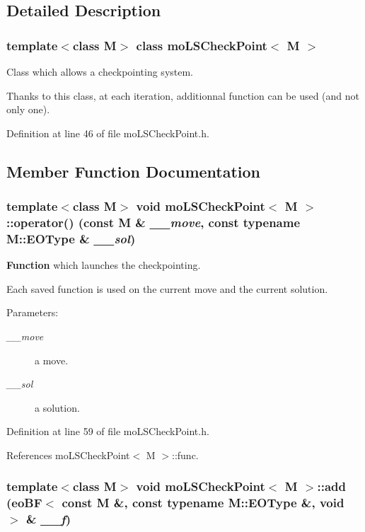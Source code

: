 \subsection{Detailed Description}
\subsubsection*{template$<$class M$>$ class moLSCheckPoint$<$ M $>$}

Class which allows a checkpointing system. 

Thanks to this class, at each iteration, additionnal function can be used (and not only one). 



Definition at line 46 of file moLSCheckPoint.h.

\subsection{Member Function Documentation}
\subsubsection{\setlength{\rightskip}{0pt plus 5cm}template$<$class M$>$ void {\bf moLSCheckPoint}$<$ M $>$::operator() (const M \& {\em \_\-\_\-move}, const typename M::EOType \& {\em \_\-\_\-sol})\hspace{0.3cm}{\tt  [inline]}}\label{classmo_l_s_check_point_2f9c1250279e3f49ec77a66c10029f1e}


{\bf Function} which launches the checkpointing. 

Each saved function is used on the current move and the current solution.

\begin{Desc}
\item[Parameters:]
\begin{description}
\item[{\em \_\-\_\-move}]a move. \item[{\em \_\-\_\-sol}]a solution. \end{description}
\end{Desc}


Definition at line 59 of file moLSCheckPoint.h.

References moLSCheckPoint$<$ M $>$::func.
\subsubsection{\setlength{\rightskip}{0pt plus 5cm}template$<$class M$>$ void {\bf moLSCheckPoint}$<$ M $>$::add ({\bf eoBF}$<$ const M \&, const typename M::EOType \&, void $>$ \& {\em \_\-\_\-f})\hspace{0.3cm}{\tt  [inline]}}\label{classmo_l_s_check_point_66be5fe2944bcdd752f1e58105e969a6}


